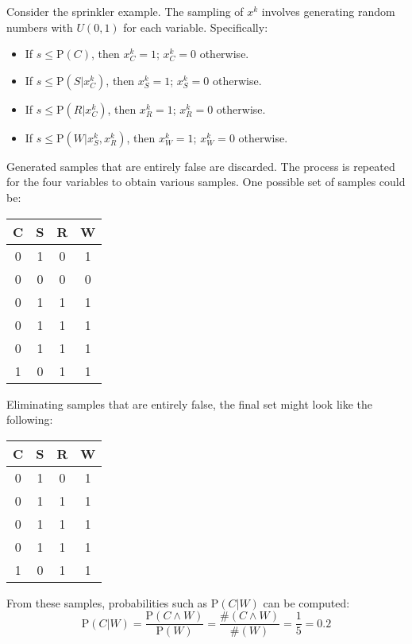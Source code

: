 \begin{example}
    Consider the sprinkler example. 
    The sampling of $x^k$ involves generating random numbers with $U(0,1)$ for each variable.
    Specifically:
    \begin{itemize}
        \item If $s\leq\text{P}(C)$, then $x_C^k=1$; $x_C^k=0$ otherwise. 
        \item If $s\leq\text{P}(S|x_C^k)$, then $x_S^k=1$; $x_S^k=0$ otherwise. 
        \item If $s\leq\text{P}(R|x_C^k)$, then $x_R^k=1$; $x_R^k=0$ otherwise. 
        \item If $s\leq\text{P}(W|x_S^k,x_R^k)$, then $x_W^k=1$; $x_W^k=0$ otherwise. 
    \end{itemize}
    Generated samples that are entirely false are discarded. 
    The process is repeated for the four variables to obtain various samples. 
    One possible set of samples could be:
    \begin{table}[H]
        \centering
        \begin{tabular}{cccc}
        \hline
        \textbf{C} & \textbf{S} & \textbf{R} & \textbf{W} \\ \hline
        0          & 1          & 0          & 1          \\
        0          & 0          & 0          & 0          \\
        0          & 1          & 1          & 1          \\
        0          & 1          & 1          & 1          \\
        0          & 1          & 1          & 1          \\
        1          & 0          & 1          & 1          \\ \hline
        \end{tabular}
    \end{table}
    Eliminating samples that are entirely false, the final set might look like the following:
    \begin{table}[H]
        \centering
        \begin{tabular}{cccc}
        \hline
        \textbf{C} & \textbf{S} & \textbf{R} & \textbf{W} \\ \hline
        0          & 1          & 0          & 1          \\
        0          & 1          & 1          & 1          \\
        0          & 1          & 1          & 1          \\
        0          & 1          & 1          & 1          \\
        1          & 0          & 1          & 1          \\ \hline
        \end{tabular}
    \end{table}
    From these samples, probabilities such as $\text{P}(C|W)$ can be computed:
    \[\text{P}(C|W)=\dfrac{\text{P}(C \land W)}{\text{P}(W)}=\dfrac{\# (C \land W)}{\#(W)}=\dfrac{1}{5}=0.2\]
\end{example}
